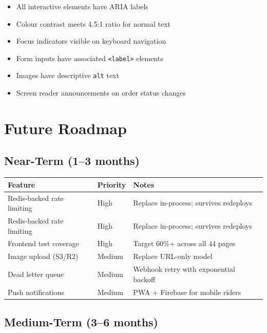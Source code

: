 \documentclass[11pt,a4paper,twoside]{book}
\newcommand{\th}[1]{\textbf{\color{white}#1}}
\begin{document}
\begin{itemize}[leftmargin=1.4em]
  \item All interactive elements have ARIA labels
  \item Colour contrast meets 4.5:1 ratio for normal text
  \item Focus indicators visible on keyboard navigation
  \item Form inputs have associated \texttt{<label>} elements
  \item Images have descriptive \texttt{alt} text
  \item Screen reader announcements on order status changes
\end{itemize}

\chapter{Future Roadmap}

\section{Near-Term (1–3 months)}

\begin{center}\small
\begin{tabular}{p{4cm}p{3cm}p{5.5cm}}
\toprule
\rowcolor{headbg}\th{Feature} & \th{Priority} & \th{Notes} \\
\midrule
Redis-backed rate limiting & High & Replace in-process; survives redeploys \\
\rowcolor{rowalt}Redis-backed rate limiting & High & Replace in-process; survives redeploys \\
Frontend test coverage  & High    & Target 60\%+ across all 44 pages \\
\rowcolor{rowalt}Image upload (S3/R2)    & Medium  & Replace URL-only model \\
Dead letter queue        & Medium  & Webhook retry with exponential backoff \\
\rowcolor{rowalt}Push notifications       & Medium  & PWA + Firebase for mobile riders \\
\bottomrule
\end{tabular}
\end{center}

\section{Medium-Term (3–6 months)}
\end{document}
